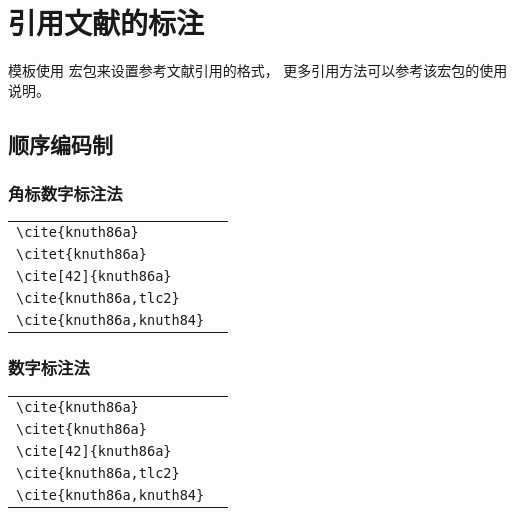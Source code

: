 
\chapter{引用文献的标注}

模板使用  宏包来设置参考文献引用的格式，
更多引用方法可以参考该宏包的使用说明。



\section{顺序编码制}

\subsection{角标数字标注法}

\noindent
\begin{tabular}{l@{\quad$\Rightarrow$\quad}l}
  \verb|\cite{knuth86a}|         & \cite{knuth86a}         \\
  \verb|\citet{knuth86a}|        & \citet{knuth86a}        \\
  \verb|\cite[42]{knuth86a}|     & \cite[42]{knuth86a}     \\
  \verb|\cite{knuth86a,tlc2}|    & \cite{knuth86a,tlc2}    \\
  \verb|\cite{knuth86a,knuth84}| & \cite{knuth86a,knuth84} \\
\end{tabular}


\subsection{数字标注法}

\noindent
\begin{tabular}{l@{\quad$\Rightarrow$\quad}l}
  \verb|\cite{knuth86a}|         & \cite{knuth86a}         \\
  \verb|\citet{knuth86a}|        & \citet{knuth86a}        \\
  \verb|\cite[42]{knuth86a}|     & \cite[42]{knuth86a}     \\
  \verb|\cite{knuth86a,tlc2}|    & \cite{knuth86a,tlc2}    \\
  \verb|\cite{knuth86a,knuth84}| & \cite{knuth86a,knuth84} \\
\end{tabular}



